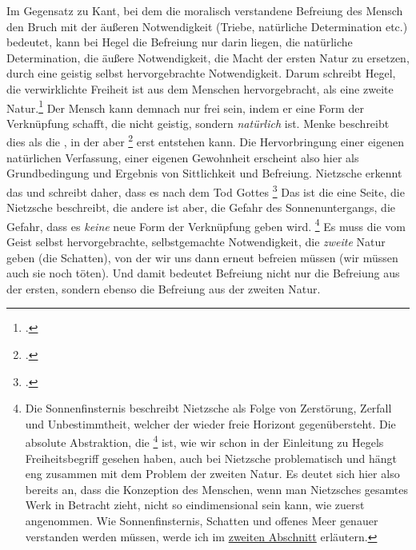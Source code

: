 \documentclass[12pt, a4paper, openany]{report}
\begin{document}
Im Gegensatz zu Kant, bei dem die moralisch verstandene Befreiung des Mensch den Bruch mit der äußeren Notwendigkeit (Triebe, natürliche Determination etc.) bedeutet, kann bei Hegel die Befreiung nur darin liegen, die natürliche Determination, die äußere Notwendigkeit, die Macht der ersten Natur zu ersetzen, durch eine geistig selbst hervorgebrachte Notwendigkeit.
Darum schreibt Hegel, die verwirklichte Freiheit ist aus dem Menschen hervorgebracht, als eine zweite Natur.\footcite[Vlg.][§4, S. 34.]{hegel_grundlinien_2017}
Der Mensch kann demnach nur frei sein, indem er eine Form der Verknüpfung schafft, die nicht geistig, sondern \emph{natürlich} ist. 
Menke beschreibt dies als die , in der aber \footcite[][40. Hervorhebung von mir]{menke_autonomie_2018} erst entstehen kann.
Die Hervorbringung einer eigenen natürlichen Verfassung, einer eigenen Gewohnheit erscheint also hier als Grundbedingung und Ergebnis von Sittlichkeit und Befreiung.
Nietzsche erkennt das und schreibt daher, dass es nach dem Tod Gottes \footcite[][§108, S. 467.]{nietzsche_morgenrote_1999}
Das ist die eine Seite, die Nietzsche beschreibt, die andere ist aber, die Gefahr des Sonnenuntergangs, die Gefahr, dass es \emph{keine} neue Form der Verknüpfung geben wird.
\footnote{%
    Die Sonnenfinsternis beschreibt Nietzsche als Folge von Zerstörung, Zerfall und Unbestimmtheit, welcher der wieder freie Horizont gegenübersteht. 
    Die absolute Abstraktion, die \footcite[][§5, S. 39.]{hegel_grundlinien_2017} ist, wie wir schon in der Einleitung zu Hegels Freiheitsbegriff gesehen haben, auch bei Nietzsche problematisch und hängt eng zusammen mit dem Problem der zweiten Natur.
    Es deutet sich hier also bereits an, dass die Konzeption des  Menschen, wenn man Nietzsches gesamtes Werk in Betracht zieht, nicht so eindimensional sein kann, wie zuerst angenommen.
    Wie Sonnenfinsternis, Schatten und offenes Meer genauer verstanden werden müssen, werde ich im \hyperref[abschnitt_2]{zweiten Abschnitt} erläutern.}
Es muss die vom Geist selbst hervorgebrachte, selbstgemachte Notwendigkeit, die \emph{zweite} Natur geben (die Schatten), von der wir uns dann erneut befreien müssen (wir müssen auch sie noch töten).
Und damit bedeutet Befreiung nicht nur die Befreiung aus der ersten, sondern ebenso die Befreiung aus der zweiten Natur. 
\end{document}

